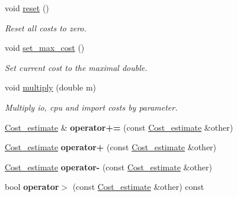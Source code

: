 \begin{DoxyCompactItemize}
void \mbox{\hyperlink{classCost__estimate_a39433a1e8b2745bf3df76b08f5ffff65}{reset}} ()
\begin{DoxyCompactList}\small\item\em Reset all costs to zero. \end{DoxyCompactList}\item 
\mbox{\label{classCost__estimate_a508d413ecfe2680a0b1c45d857ac840b}} 
void \mbox{\hyperlink{classCost__estimate_a508d413ecfe2680a0b1c45d857ac840b}{set\+\_\+max\+\_\+cost}} ()
\begin{DoxyCompactList}\small\item\em Set current cost to the maximal double. \end{DoxyCompactList}\item 
\mbox{\label{classCost__estimate_ace2183a6e8a050764f19208a5bd16181}} 
void \mbox{\hyperlink{classCost__estimate_ace2183a6e8a050764f19208a5bd16181}{multiply}} (double m)
\begin{DoxyCompactList}\small\item\em Multiply io, cpu and import costs by parameter. \end{DoxyCompactList}\item 
\mbox{\label{classCost__estimate_add5c3fefc739d4de2e9de1f339324114}} 
\mbox{\hyperlink{classCost__estimate}{Cost\+\_\+estimate}} \& {\bfseries operator+=} (const \mbox{\hyperlink{classCost__estimate}{Cost\+\_\+estimate}} \&other)
\item 
\mbox{\label{classCost__estimate_afb07097f65ede89e02405956bdb4082d}} 
\mbox{\hyperlink{classCost__estimate}{Cost\+\_\+estimate}} {\bfseries operator+} (const \mbox{\hyperlink{classCost__estimate}{Cost\+\_\+estimate}} \&other)
\item 
\mbox{\label{classCost__estimate_a2bb04b7c2ba92b554f4a2fd311923c83}} 
\mbox{\hyperlink{classCost__estimate}{Cost\+\_\+estimate}} {\bfseries operator-\/} (const \mbox{\hyperlink{classCost__estimate}{Cost\+\_\+estimate}} \&other)
\item 
\mbox{\label{classCost__estimate_af8595c106ea8cd4bc90afdbdfe051bd1}} 
bool {\bfseries operator$>$} (const \mbox{\hyperlink{classCost__estimate}{Cost\+\_\+estimate}} \&other) const

\end{DoxyCompactItemize}
